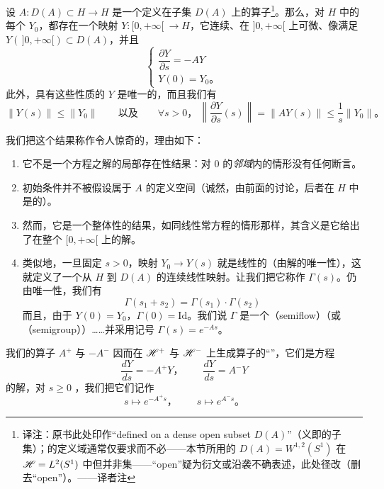 \begin{theorem}\label{thm:hille-yosida}
设 $A\colon D(A)\subset H\to H$ 是一个定义在\trDense{}子集 $D(A)$ 上的\trSelfAdjoint\trMonotone\trClosed{}算子\footnote{译注：原书此处印作“defined on a dense open subset $D(A)$”（义即\trDense{}的\trOpen{}子集）；\trUnboundedOperator{}的定义域通常仅要求\trDense{}而不必\trOpen{}——本节所用的 $D(A)=W^{1,2}(S^{1})$ 在 $\mathscr{H}=L^{2}(S^{1})$ 中\trDense{}但并非\trOpen{}集——“open”疑为衍文或沿袭不确表述，此处径改（删去“open”）。——译者注}。那么，对 $H$ 中的每个 $Y_0$，都存在一个映射 $Y\colon[0,+\infty[\ \to H$，它连续、在 $]0,+\infty[$ 上可微、像满足 $Y(\,]0,+\infty[)\subset D(A)$，并且
\[
\left\{\begin{array}{l}
\dfrac{\partial Y}{\partial s}=-AY\\[8pt]
Y(0)=Y_0\text{。}
\end{array}\right.
\]
此外，具有这些性质的 $Y$ 是唯一的，而且我们有
\[
\|Y(s)\|\le\|Y_0\|\qquad\text{以及}\qquad\forall s>0\text{，}\ \left\|\frac{\partial Y}{\partial s}(s)\right\|=\|AY(s)\|\le\frac{1}{s}\|Y_0\|\text{。}
\]
\end{theorem}

\begin{remark}\label{thm:hille-yosida-remarks}
我们把这个结果称作令人惊奇的，理由如下：
\begin{enumerate}[label=(\arabic*)]
\item 它不是一个\trDifferential{}方程之解的局部存在性结果：对 $0$ 的\emph{邻域}内的情形没有任何断言。
\item 初始条件并不被假设属于 $A$ 的定义空间（诚然，由前面的讨论，后者在 $H$ 中是\trDense{}的）。
\item 然而，它是一个整体性的结果，如同线性常\trDifferential{}方程的情形那样，其含义是它给出了在整个 $[0,+\infty[$ 上的解。
\item 类似地，一旦固定 $s>0$，映射 $Y_0\to Y(s)$ 就是线性的（由解的唯一性），这就定义了一个从 $H$ 到 $D(A)$ 的连续线性映射。让我们把它称作 $\Gamma(s)$。仍由唯一性，我们有
\[
\Gamma(s_1+s_2)=\Gamma(s_1)\cdot\Gamma(s_2)
\]
而且，由于 $Y(0)=Y_0$，$\Gamma(0)=\mathrm{Id}$。我们说 $\Gamma$ 是一个\textbf{\trSemiflow}（semiflow）（或\textbf{\trSemigroup}（semigroup））……并采用记号 $\Gamma(s)=e^{-As}$。
\end{enumerate}
\end{remark}

我们的算子 $A^{+}$ 与 $-A^{-}$ 因而在 $\mathscr{H}^{+}$ 与 $\mathscr{H}^{-}$ 上生成算子的“\trSemigroup”，它们是\trDifferential{}方程
\[
\frac{dY}{ds}=-A^{+}Y\text{，}\qquad\frac{dY}{ds}=A^{-}Y
\]
的解，对 $s\ge 0$ \trWellDefined，我们把它们记作
\[
s\longmapsto e^{-A^{+}s}\text{，}\qquad s\longmapsto e^{A^{-}s}\text{。}
\]

